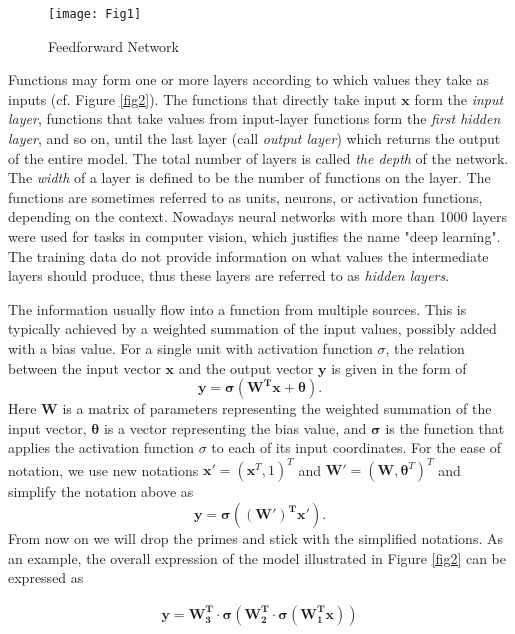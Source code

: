 \begin{wrapfigure}{r}{0.3\textwidth}
\centering
\texttt{[image: Fig1]}
\caption{Feedforward Network}
\label{fig1}
\end{wrapfigure}



Functions may form one or more layers according to which values they take as inputs (cf. Figure \ref{fig2}). The functions that directly take input $\bm{x}$ form the \textit{input layer}, functions that take values from input-layer functions form the \textit{first hidden layer}, and so on, until the last layer (call \textit{output layer}) which returns the output of the entire model. The total number of layers is called \textit{the depth} of the network. The \textit{width} of a layer is defined to be the number of functions on the layer. The functions are sometimes referred to as units, neurons, or activation functions, depending on the context. Nowadays neural networks with more than 1000 layers were used for tasks in computer vision, which justifies the name "deep learning". The training data do not provide information on what values the intermediate layers should produce, thus these layers are referred to as \textit{hidden layers}.

The information usually flow into a function from multiple sources. This is typically achieved by a weighted summation of the input values, possibly added with a bias value. For a single unit with activation function $\sigma$, the relation between the input vector $\bm x$ and the output vector $\bm y$ is given in the form of
\begin{equation}
    \bm y = \bm \sigma(\bm{W^Tx}+\bm\theta).
\end{equation}
Here $\bm W$ is a matrix of parameters representing the weighted summation of the input vector, $\bm\theta$ is a vector representing the bias value, and $\bm\sigma$ is the function that applies the activation function $\sigma$ to each of its input coordinates. For the ease of notation, we use new notations
$\bm x' = (\bm x^T, 1)^T$ and $\bm W' = (\bm W, \bm\theta^T)^T$ and simplify the notation above as
\begin{equation}
 \bm y = \bm \sigma(\bm{(W')^Tx'}).
\end{equation}
From now on we will drop the primes and stick with the simplified notations. As an example, the overall expression of the model illustrated in Figure \ref{fig2} can be expressed as

\begin{align*}
\bm{y} = \bm{W_3^T\cdot\sigma(W_2^T\cdot\sigma
(W_1^Tx))}
\end{align*}

